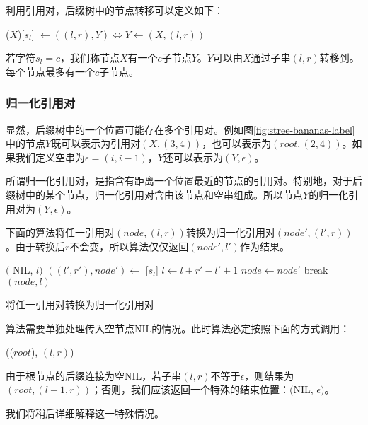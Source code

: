 \documentclass[UTF8]{article}
\begin{document}
利用引用对，后缀树中的节点转移可以定义如下：

($X$)[$s_l$] $\gets ((l, r), Y) \iff Y \gets (X, (l, r))$

若字符$s_l=c$，我们称节点$X$有一个$c$子节点$Y$。$Y$可以由$X$通过子串$(l, r)$转移到。每个节点最多有一个$c$子节点。

\subsubsection{归一化引用对}

显然，后缀树中的一个位置可能存在多个引用对。例如图\ref{fig:stree-bananas-label}中的节点$Y$既可以表示为引用对$(X, (3, 4))$，也可以表示为$(root, (2, 4))$。如果我们定义空串为$\epsilon=(i, i-1)$，$Y$还可以表示为$(Y, \epsilon)$。

所谓归一化引用对，是指含有距离一个位置最近的节点的引用对。特别地，对于后缀树中的某个节点，归一化引用对含由该节点和空串组成。所以节点$Y$的归一化引用对为$(Y, \epsilon)$。

下面的算法将任一引用对$(node, (l, r))$转换为归一化引用对$(node', (l', r))$。由于转换后$r$不会变，所以算法仅仅返回$(node', l')$作为结果。

\begin{algorithm}
\begin{algorithmic}[1]
      \State \Return $($ NIL, $l)$
    \Else
      \State \Return {}
    \EndIf
  \EndIf
   
    \State $((l', r'), node') \gets$ [$s_l$]
      \State $l \gets l + r' - l' + 1$ 
      \State $node \gets node'$
    \Else
      \State break
    \EndIf
  \EndWhile
  \State \Return $(node, l)$
\EndFunction
\end{algorithmic}
\caption{将任一引用对转换为归一化引用对}
\label{algo:canon}
\end{algorithm}

算法需要单独处理传入空节点NIL的情况。此时算法必定按照下面的方式调用：

(($root$), $(l, r)$)

由于根节点的后缀连接为空NIL，若子串$(l, r)$不等于$\epsilon$，则结果为$(root, (l+1, r))$；否则，我们应该返回一个特殊的结束位置：$($NIL, $\epsilon)$。

我们将稍后详细解释这一特殊情况。
\end{document}
